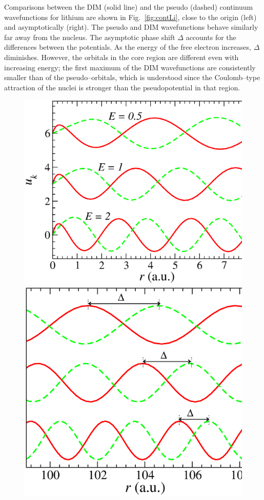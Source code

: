 \documentclass[10pt]{article}
\begin{document}
Comparisons between the DIM (solid line) and the pseudo (dashed)
continuum wavefunctions for lithium are shown in 
Fig.~\ref{fig:contLi}, close to the origin (left) and asymptotically 
(right). The pseudo and DIM wavefunctions behave similarly far away 
from the nucleus. The asymptotic phase shift $\Delta$ accounts for 
the differences between the potentials. As the energy of the free 
electron increases, $\Delta$ diminishes. However, the orbitals in the 
core region are different even with increasing energy; the first 
maximum of the DIM wavefunctions are consistently smaller than of the 
pseudo--orbitals, which is understood since the Coulomb--type 
attraction of the nuclei is stronger than the pseudopotential in that 
region. 
\begin{figure}[H]
\centering
\includegraphics[height=0.23\textheight]{figures/pseudopot/LicontA.eps}
\includegraphics[height=0.23\textheight]{figures/pseudopot/LicontB.eps}

\end{figure}
\end{document}
